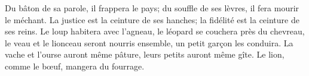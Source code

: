 Du bâton de sa parole, il frappera le pays;
	du souffle de ses lèvres, il fera mourir le méchant.
La justice est la ceinture de ses hanches;
	la fidélité est la ceinture de ses reins.
Le loup habitera avec l’agneau, le léopard se couchera près du chevreau,
	le veau et le lionceau seront nourris ensemble, un petit garçon les conduira.
La vache et l’ourse auront même pâture, leurs petits auront même gîte.
	Le lion, comme le bœuf, mangera du fourrage.
